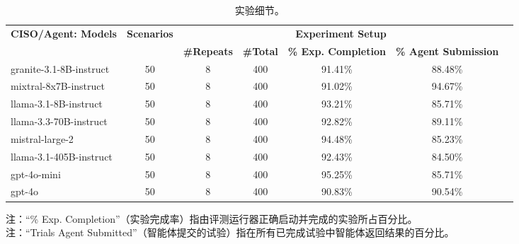\begin{table}[H]
\centering
\caption{实验细节。}
\label{tab:itbench-23}
\begin{adjustbox}{max width=\linewidth}
\begin{tabular}{lcccccc}
\toprule
\multirow{2}{*}{\textbf{CISO/Agent: Models}} & \multirow{2}{*}{\textbf{Scenarios}} & \multicolumn{4}{c}{\textbf{Experiment Setup}} \\
\cmidrule(lr){3-6}
 & & \textbf{\#Repeats} & \textbf{\#Total} & \textbf{\% Exp. Completion} & \textbf{\% Agent Submission} \\
\midrule
granite-3.1-8B-instruct  & 50 & 8 & 400 & 91.41\% & 88.48\% \\
mixtral-8x7B-instruct    & 50 & 8 & 400 & 91.02\% & 94.67\% \\
llama-3.1-8B-instruct    & 50 & 8 & 400 & 93.21\% & 85.71\% \\
llama-3.3-70B-instruct   & 50 & 8 & 400 & 92.82\% & 89.11\% \\
mistral-large-2          & 50 & 8 & 400 & 94.48\% & 85.23\% \\
llama-3.1-405B-instruct  & 50 & 8 & 400 & 92.43\% & 84.50\% \\
gpt-4o-mini              & 50 & 8 & 400 & 95.25\% & 85.71\% \\
gpt-4o                   & 50 & 8 & 400 & 90.83\% & 90.54\% \\
\bottomrule
\end{tabular}
\end{adjustbox}
\par\smallskip
\footnotesize\raggedright
注：``\% Exp. Completion''（实验完成率）指由评测运行器正确启动并完成的实验所占百分比。\\
注：``Trials Agent Submitted''（智能体提交的试验）指在所有已完成试验中智能体返回结果的百分比。
\end{table}

